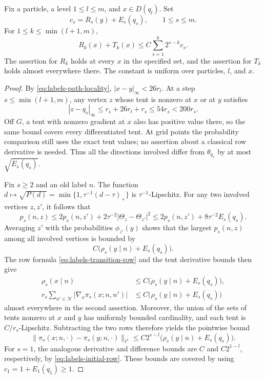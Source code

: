 \begin{lemma}
\label{lem:labels-spatial-comparison}
Fix a particle, a level $1\le l\le m$, and $x\in D(q_l)$. Set
\[
 c_s=R_s(y)+E_s(q_s),\qquad 1\le s\le m.
\]
For $1\le k\le\min(l+1,m)$,
\begin{equation}
 R_k(x)+T_k(x)
 \le C\sum_{s=1}^k2^{s-k}c_s.
 \label{eq:labels-spatial-comparison}
\end{equation}
The assertion for $R_k$ holds at every $x$ in the specified set, and the
assertion for $T_k$ holds almost everywhere there. The constant is uniform
over particles, $l$, and $x$.
\end{lemma}

\begin{proof}
By \eqref{eq:labels-path-locality},
$|x-y|_{\infty}<26r_l$. At a step $s\le\min(l+1,m)$, any vertex $z$ whose
tent is nonzero at $x$ or at $y$ satisfies
\[
 |z-q_s|_{\infty}
 \le r_s+26r_l+r_s
 \le54r_s<200r_s.
\]
Off $G$, a tent with nonzero gradient at $x$ also has positive value
there, so the same bound covers every differentiated tent. At grid
points the probability comparison still uses the exact tent values;
no assertion about a classical row derivative is needed.
Thus all the directions involved differ from
$\theta_{q_s}$ by at most $\sqrt{E_s(q_s)}$.

Fix $s\ge2$ and an old label $n$. The function
$d\mapsto\sqrt{P(d)}=\min\{1,\tau^{-1}(d-\tau)_+\}$ is
$\tau^{-1}$-Lipschitz. For any two involved vertices $z,z'$, it follows that
\[
 p_s(n,z)
 \le2p_s(n,z')+2\tau^{-2}|\Theta_z-\Theta_{z'}|^2
 \le2p_s(n,z')+8\tau^{-2}E_s(q_s).
\]
Averaging $z'$ with the probabilities $\phi_{z'}(y)$ shows that the largest
$p_s(n,z)$ among all involved vertices is bounded by
\begin{equation}
 C\bigl(\rho_s(y\mid n)+E_s(q_s)\bigr).
 \label{eq:labels-row-rate-comparison}
\end{equation}
The row formula \eqref{eq:labels-transition-row} and the tent derivative
bounds then give
\begin{align}
 \rho_s(x\mid n)
 &\le C\bigl(\rho_s(y\mid n)+E_s(q_s)\bigr),
 \label{eq:labels-row-rate}\\
 r_s\sum_{n'\in\mathcal N}|\nabla_x\pi_s(x;n,n')|
 &\le C\bigl(\rho_s(y\mid n)+E_s(q_s)\bigr)
 \label{eq:labels-row-derivative}
\end{align}
almost everywhere in the second assertion. Moreover, the union of the
sets of tents nonzero at $x$ and $y$ has uniformly bounded cardinality,
and each tent is $C/r_s$-Lipschitz. Subtracting the two rows therefore
yields the pointwise bound
\begin{equation}
 \|\pi_s(x;n,\cdot)-\pi_s(y;n,\cdot)\|_{\ell^1}
 \le C2^{s-l}\bigl(\rho_s(y\mid n)+E_s(q_s)\bigr).
 \label{eq:labels-row-difference}
\end{equation}
For $s=1$, the analogous derivative and difference bounds are $C$ and
$C2^{1-l}$, respectively, by \eqref{eq:labels-initial-row}.
These bounds are covered by using $c_1=1+E_1(q_1)\ge1$.


\end{proof}

